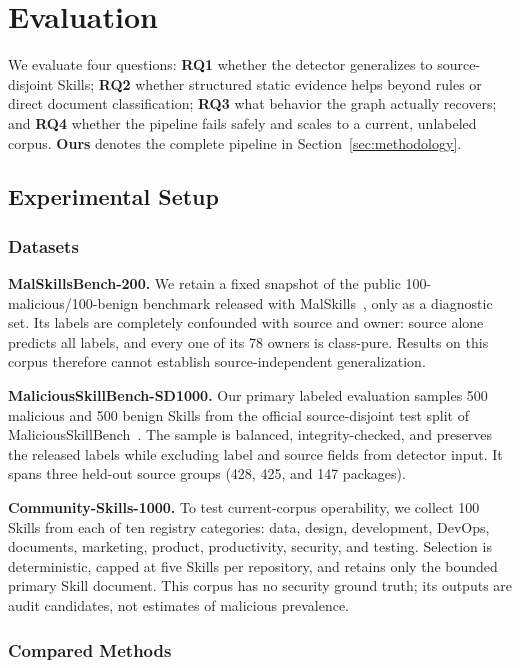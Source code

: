 \section{Evaluation}
\label{sec:evaluation}

We evaluate four questions: \textbf{RQ1} whether the detector generalizes to
source-disjoint Skills; \textbf{RQ2} whether structured static evidence helps
beyond rules or direct document classification; \textbf{RQ3} what behavior the
graph actually recovers; and \textbf{RQ4} whether the pipeline fails safely and
scales to a current, unlabeled corpus. \textbf{Ours} denotes the complete
pipeline in Section~\ref{sec:methodology}.

\subsection{Experimental Setup}

\subsubsection{Datasets}

\textbf{MalSkillsBench-200.} We retain a fixed snapshot of the public
100-malicious/100-benign benchmark released with
MalSkills~\cite{wang2026malskills}, only as a diagnostic set.
Its labels are completely confounded with source and owner: source alone
predicts all labels, and every one of its 78 owners is class-pure. Results on
this corpus therefore cannot establish source-independent generalization.

\textbf{MaliciousSkillBench-SD1000.} Our primary labeled evaluation samples
500 malicious and 500 benign Skills from the official source-disjoint test
split of MaliciousSkillBench~\cite{wang2026maliciousskillbench}. The sample is
balanced, integrity-checked, and preserves the released labels while excluding
label and source fields from detector input. It spans three held-out source
groups (428, 425, and 147 packages).

\textbf{Community-Skills-1000.} To test current-corpus operability, we collect
100 Skills from each of ten registry categories: data, design, development,
DevOps, documents, marketing, product, productivity, security, and testing.
Selection is deterministic, capped at five Skills per repository, and retains
only the bounded primary Skill document. This corpus has no security ground
truth; its outputs are audit candidates, not estimates of malicious prevalence.

\subsubsection{Compared Methods}

